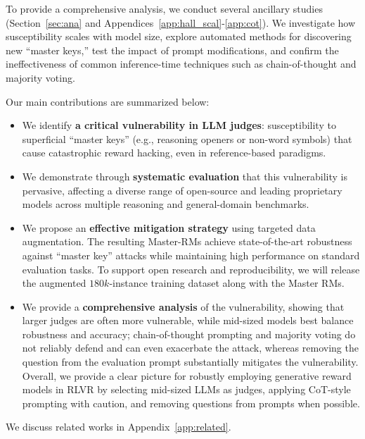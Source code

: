 To provide a comprehensive analysis, we conduct several ancillary studies (Section~\ref{sec:ana} and Appendices~\ref{app:hall_scal}-\ref{app:cot}). We investigate how susceptibility scales with model size, explore automated methods for discovering new ``master keys,'' test the impact of prompt modifications, and confirm the ineffectiveness of common inference-time techniques such as chain-of-thought and majority voting.

Our main contributions are summarized below:
\vspace{-1.5mm}

\begin{itemize}
    \item We identify \textbf{a critical vulnerability in LLM judges}: susceptibility to superficial ``master keys'' (e.g., reasoning openers or non-word symbols) that cause catastrophic reward hacking, even in reference-based paradigms. 

    \vspace{-1.5mm}
    \item We demonstrate through \textbf{systematic evaluation} that this vulnerability is pervasive, affecting a diverse range of open-source and leading proprietary models across multiple reasoning and general-domain benchmarks.
    \vspace{-1.5mm}
    
    \item We propose an \textbf{effective mitigation strategy} using targeted data augmentation. The resulting Master-RMs achieve state-of-the-art robustness against ``master key'' attacks while maintaining high performance on standard evaluation tasks. To support open research and reproducibility, we will release the augmented $180k$-instance training dataset along with the Master RMs.
    \vspace{-1.5mm}
    
    \item We provide a \textbf{comprehensive analysis} of the vulnerability, showing that larger judges are often more vulnerable, while mid-sized models best balance robustness and accuracy; chain-of-thought prompting and majority voting do not reliably defend and can even exacerbate the attack, whereas removing the question from the evaluation prompt substantially mitigates the vulnerability. Overall, we provide a clear picture for robustly employing generative reward models in RLVR by selecting mid-sized LLMs as judges, applying CoT-style prompting with caution, and removing questions from prompts when possible.
    \vspace{-1.5mm}
    
\end{itemize}
We discuss related works in Appendix~\ref{app:related}.






